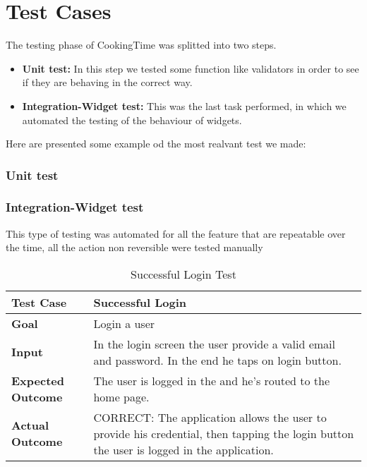 \chapter{Test Cases}
The testing phase of CookingTime was splitted into two steps.

\begin{itemize}
	\item \textbf{Unit test:} In this step we tested some function like validators in order to see if they are behaving in the correct way.
	\item \textbf{Integration-Widget test:} This was the last task performed, in which we automated the testing of the behaviour of widgets.
\end{itemize}

Here are presented some example od the most realvant test we made:

\subsection{Unit test}

\subsection{Integration-Widget test}
This type of testing was automated for all the feature that are repeatable over the time, all the action non reversible were tested manually

\begin{table}[H]
	\centering
	\begin{tabular}{ll}
	\hline
	\textbf{Test Case}& Successful Login\\
	\hline
	\textbf{Goal}& Login a user\\
	\hline
	\textbf{Input}& In the login screen the user provide a valid email and password. In the end he taps on login button.\\
	\hline
	\textbf{Expected Outcome}& The user is logged in the and he's routed to the home page.\\
	\hline
	\textbf{Actual Outcome}& CORRECT: The application allows the user to provide his credential, then tapping the login button the user is logged in the application.\\
	\hline	
	\end{tabular}
	\caption{Successful Login Test}
\end{table}


